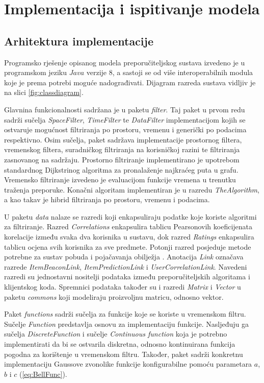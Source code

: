 \documentclass[times, utf8, diplomski, numeric]{fer}
\begin{document}
\chapter{Implementacija i ispitivanje modela}
\section{Arhitektura implementacije}

Programsko rješenje opisanog modela preporučiteljskog sustava izvedeno je u
programskom jeziku $Java$ verzije $8$, a sastoji se od više interoperabilnih
modula koje je prema potrebi moguće nadograđivati. Dijagram razreda sustava
vidljiv je na slici \ref{fig:classdiagram}.

Glavnina funkcionalnosti sadržana je u paketu \emph{filter}. Taj paket u prvom
redu sadrži sučelja \emph{SpaceFilter}, \emph{TimeFilter} te \emph{DataFilter}
implementacijom kojih se ostvaruje mogućnost filtriranja po prostoru, vremenu i
generički po podacima respektivno.
Osim sučelja, paket sadržava implementacije prostornog filtera, vremenskog
filtera, suradničkog filtriranja na korisničkoj razini te filtriranja zasnovanog
na sadržaju. Prostorno filtriranje implementirano je upotrebom standardnog
Dijkstrinog algoritma za pronalaženje najkraćeg puta u grafu. Vremensko
filtriranje izvedeno je evaluacijom funkcije vremena u trenutku traženja
preporuke. Konačni algoritam implementiran je u razredu \emph{TheAlgorithm}, a
kao takav je hibrid filtriranja po prostoru, vremenu i podacima.

U paketu \emph{data} nalaze se razredi koji enkapsuliraju podatke koje koriste
algoritmi za filtriranje. Razred \emph{Correlations} enkapsulira tablicu
Pearsonovih koeficijenata korelacije između svaka dva korisnika u sustavu, dok
razred \emph{Ratings} enkapsulira tablicu ocjena svih korisnika za sve predmete.
Potonji razred posjeduje metode potrebne za sustav pobuda i pojačavanja
obilježja . Anotacija  \emph{Link} označava
razrede \emph{ItemBeaconLink}, \emph{ItemPredictionLink} i
\emph{UserCorrelationLink}. Navedeni razredi su jednostavni nositelji podataka
između preporučiteljskih algoritama i klijentskog koda. Spremnici podataka
također su i razredi \emph{Matrix} i \emph{Vector} u paketu \emph{commons} koji
modeliraju proizvoljnu matricu, odnosno vektor.

Paket \emph{functions} sadrži sučelja za funkcije koje se koriste u vremenskom
filtru. Sučelje \emph{Function} predstavlja osnovu za implementaciju funkcije.
Nasljeđuju ga sučelja \emph{DiscreteFunction} i sučelje \emph{Continuous
function} koja je potrebno implementirati da bi se ostvarila diskretna, odnosno
kontinuirana funkcija pogodna za korištenje u vremenskom filtru. Također, paket
sadrži konkretnu implementaciju Gaussove zvonolike funkcije konfigurabilne
pomoću parametara $a$, $b$ i $c$ (\ref{eq:BellFunc}).
\end{document}
